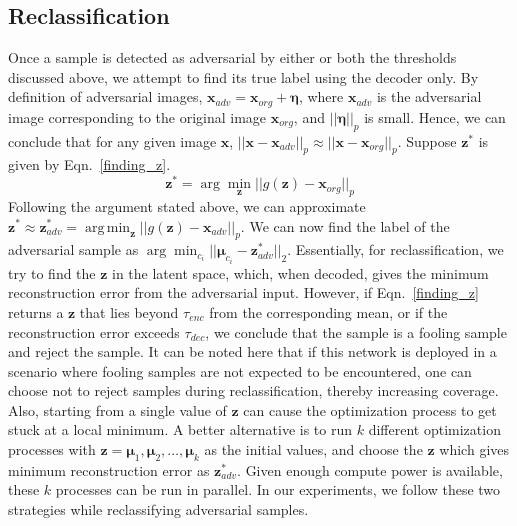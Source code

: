\documentclass[letterpaper]{article} %
\DeclareMathOperator*{\argmin}{arg\,min}
\begin{document}
\subsection{Reclassification}
\label{reclassification}
Once a sample is detected as adversarial by either or both the thresholds discussed above, we attempt to find its true label using the decoder only. By definition of adversarial images, $\mathbf{x}_{adv} = \mathbf{x}_{org} + \boldsymbol{\eta}$, where $\mathbf{x}_{adv}$ is the adversarial image corresponding to the original image $\mathbf{x}_{org}$, and $||\boldsymbol{\eta}||_{p}$ is small. Hence, we can conclude that for any given image $\mathbf{x}$, $||\mathbf{x} - \mathbf{x}_{adv}||_p \approx ||\mathbf{x} - \mathbf{x}_{org}||_p$. Suppose $\mathbf{z}^*$ is given by Eqn.~\ref{finding_z}.
\begin{equation}
\mathbf{z}^* = \arg\min_{\mathbf{z}}{||g(\mathbf{z}) - \mathbf{x}_{org}||_p}
\label{finding_z}
\end{equation}
Following the argument stated above, we can approximate $\mathbf{z}^*\approx \mathbf{z}^*_{adv} = \argmin_\mathbf{z}{||g(\mathbf{z}) - \mathbf{x}_{adv}||_p}$. We can now find the label of the adversarial sample as $\arg\min_{c_i}{||\boldsymbol{\mu}_{c_i} - \mathbf{z}^*_{adv}||_2}$.
Essentially, for reclassification, we try to find the $\mathbf{z}$ in the latent space, which, when decoded, gives the minimum reconstruction error from the adversarial input. However, if Eqn.~\ref{finding_z} returns a $\mathbf{z}$ that lies beyond $\tau_{enc}$ from the corresponding mean, or if the reconstruction error exceeds $\tau_{dec}$, we conclude that the sample is a fooling sample and reject the sample. It can be noted here that if this network is deployed in a scenario where fooling samples are not expected to be encountered, one can choose not to reject samples during reclassification, thereby increasing coverage. Also, starting from a single value of $\mathbf{z}$ can cause the optimization process to get stuck at a local minimum. A better alternative is to run $k$ different optimization processes with $\mathbf{z} = \boldsymbol{\mu}_{1}, \boldsymbol{\mu}_{2}, \dots, \boldsymbol{\mu}_{k}$ as the initial values, and choose the $\mathbf{z}$ which gives minimum reconstruction error as $\mathbf{z}^*_{adv}$. Given enough compute power is available, these $k$ processes can be run in parallel. In our experiments, we follow these two strategies while reclassifying adversarial samples.
\end{document}
